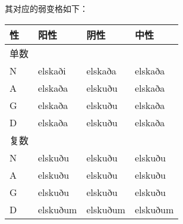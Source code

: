 其对应的弱变格如下：

\begin{longtable}{llll}
    \toprule
    性   & 阳性     & 阴性     & 中性     \\
    \midrule
    \endhead
    \bottomrule
    \endfoot
    单数 &          &          &          \\
    N    & elskaði  & elskaða  & elskaða  \\
    A    & elskaða  & elskuðu  & elskaða  \\
    G    & elskaða  & elskuðu  & elskaða  \\
    D    & elskaða  & elskuðu  & elskaða  \\
    复数 &          &          &          \\
    N    & elskuðu  & elskuðu  & elskuðu  \\
    A    & elskuðu  & elskuðu  & elskuðu  \\
    G    & elskuðu  & elskuðu  & elskuðu  \\
    D    & elskuðum & elskuðum & elskuðum \\
\end{longtable}
